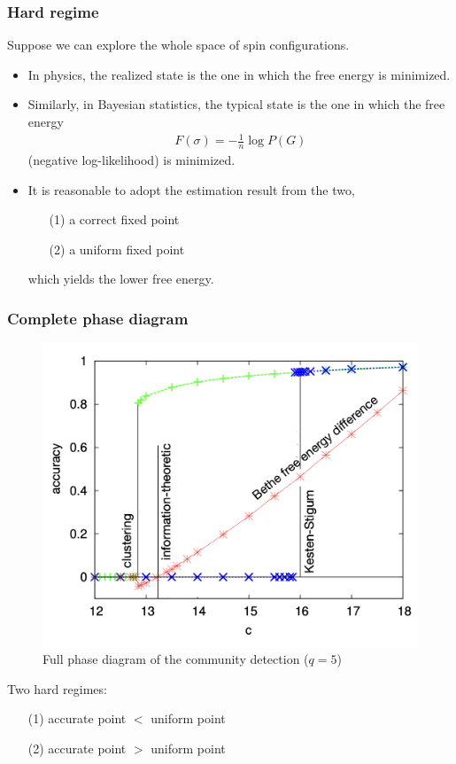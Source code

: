\documentclass[dvipdfmx,11pt]{beamer}
\begin{document}
\begin{frame}
  \frametitle{Hard regime}
  Suppose we can explore the whole space of spin configurations.
  \begin{itemize}
    \item In physics, the realized state is the one in which the \alert{free energy} is minimized.
    \item Similarly, in Bayesian statistics, the typical state is the one in which the free energy
    \begin{align*}
      F(\sigma) = - \frac{1}{n} \log P(G)
    \end{align*}
    (negative log-likelihood) is minimized.
    \item It is reasonable to adopt the estimation result from the two, 
    \begin{itemize}
      \item[(1)] a correct fixed point
      \item[(2)] a uniform fixed point
    \end{itemize} 
    which yields the lower free energy.
  \end{itemize}
\end{frame}

\begin{frame}
  \frametitle{Complete phase diagram}
  \begin{figure}
    \centering
    \includegraphics[width=0.55\linewidth]{figure/phase3.png}
    \caption{Full phase diagram of the community detection ($q = 5$)}
  \end{figure}
  Two hard regimes:
  \begin{itemize}
    \item[(1)] accurate point $<$ uniform point 
    \item[(2)] accurate point $>$ uniform point 
  \end{itemize}
\end{frame}
\end{document}

